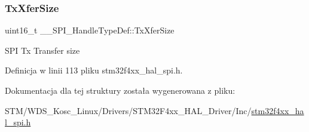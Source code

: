 \subsubsection{\texorpdfstring{Tx\+Xfer\+Size}{TxXferSize}}
{\footnotesize\ttfamily uint16\+\_\+t \+\_\+\+\_\+\+S\+P\+I\+\_\+\+Handle\+Type\+Def\+::\+Tx\+Xfer\+Size}

S\+PI Tx Transfer size 

Definicja w linii 113 pliku stm32f4xx\+\_\+hal\+\_\+spi.\+h.



Dokumentacja dla tej struktury została wygenerowana z pliku\+:\begin{DoxyCompactItemize}
\item 
S\+T\+M/\+W\+D\+S\+\_\+\+Kosc\+\_\+\+Linux/\+Drivers/\+S\+T\+M32\+F4xx\+\_\+\+H\+A\+L\+\_\+\+Driver/\+Inc/\hyperlink{stm32f4xx__hal__spi_8h}{stm32f4xx\+\_\+hal\+\_\+spi.\+h}\end{DoxyCompactItemize}
